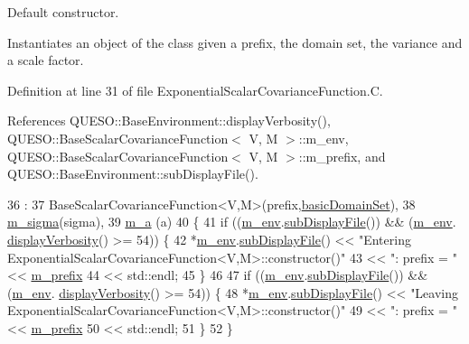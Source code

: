 Default constructor. 

Instantiates an object of the class given a prefix, the domain set, the variance and a scale factor. 

Definition at line 31 of file Exponential\-Scalar\-Covariance\-Function.\-C.



References Q\-U\-E\-S\-O\-::\-Base\-Environment\-::display\-Verbosity(), Q\-U\-E\-S\-O\-::\-Base\-Scalar\-Covariance\-Function$<$ V, M $>$\-::m\-\_\-env, Q\-U\-E\-S\-O\-::\-Base\-Scalar\-Covariance\-Function$<$ V, M $>$\-::m\-\_\-prefix, and Q\-U\-E\-S\-O\-::\-Base\-Environment\-::sub\-Display\-File().


\begin{DoxyCode}
36   : 
37   BaseScalarCovarianceFunction<V,M>(prefix,\hyperlink{class_q_u_e_s_o_1_1_base_scalar_covariance_function_a703aa6a8e475adaface0ec514b48a5bc}{basicDomainSet}),
38   \hyperlink{class_q_u_e_s_o_1_1_exponential_scalar_covariance_function_aece243cd9fbe9bdd7720b422c2f7513a}{m\_sigma}(sigma),
39   \hyperlink{class_q_u_e_s_o_1_1_exponential_scalar_covariance_function_a16940568b7c22abb6caf31ccfb505c16}{m\_a}    (a)
40 \{
41   \textcolor{keywordflow}{if} ((\hyperlink{class_q_u_e_s_o_1_1_base_scalar_covariance_function_a2a100016b480c498b5219fb937d62543}{m\_env}.\hyperlink{class_q_u_e_s_o_1_1_base_environment_a8a0064746ae8dddfece4229b9ad374d6}{subDisplayFile}()) && (\hyperlink{class_q_u_e_s_o_1_1_base_scalar_covariance_function_a2a100016b480c498b5219fb937d62543}{m\_env}.
      \hyperlink{class_q_u_e_s_o_1_1_base_environment_a1fe5f244fc0316a0ab3e37463f108b96}{displayVerbosity}() >= 54)) \{
42     *\hyperlink{class_q_u_e_s_o_1_1_base_scalar_covariance_function_a2a100016b480c498b5219fb937d62543}{m\_env}.\hyperlink{class_q_u_e_s_o_1_1_base_environment_a8a0064746ae8dddfece4229b9ad374d6}{subDisplayFile}() << \textcolor{stringliteral}{"Entering
       ExponentialScalarCovarianceFunction<V,M>::constructor()"}
43                             << \textcolor{stringliteral}{": prefix = "} << \hyperlink{class_q_u_e_s_o_1_1_base_scalar_covariance_function_a21636873436b88cb77075c6edbd61c71}{m\_prefix}
44                             << std::endl;
45   \}
46 
47   \textcolor{keywordflow}{if} ((\hyperlink{class_q_u_e_s_o_1_1_base_scalar_covariance_function_a2a100016b480c498b5219fb937d62543}{m\_env}.\hyperlink{class_q_u_e_s_o_1_1_base_environment_a8a0064746ae8dddfece4229b9ad374d6}{subDisplayFile}()) && (\hyperlink{class_q_u_e_s_o_1_1_base_scalar_covariance_function_a2a100016b480c498b5219fb937d62543}{m\_env}.
      \hyperlink{class_q_u_e_s_o_1_1_base_environment_a1fe5f244fc0316a0ab3e37463f108b96}{displayVerbosity}() >= 54)) \{
48     *\hyperlink{class_q_u_e_s_o_1_1_base_scalar_covariance_function_a2a100016b480c498b5219fb937d62543}{m\_env}.\hyperlink{class_q_u_e_s_o_1_1_base_environment_a8a0064746ae8dddfece4229b9ad374d6}{subDisplayFile}() << \textcolor{stringliteral}{"Leaving
       ExponentialScalarCovarianceFunction<V,M>::constructor()"}
49                             << \textcolor{stringliteral}{": prefix = "} << \hyperlink{class_q_u_e_s_o_1_1_base_scalar_covariance_function_a21636873436b88cb77075c6edbd61c71}{m\_prefix}
50                             << std::endl;
51   \}
52 \}
\end{DoxyCode}
